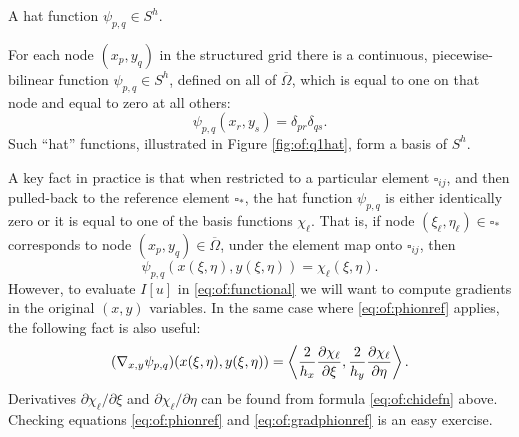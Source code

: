 \begin{marginfigure}

\caption{A hat function $\psi_{p,q} \in S^h$.}
\label{fig:of:q1hat}
\end{marginfigure}

For each node $(x_p,y_q)$ in the structured grid there is a continuous, piecewise-bilinear function $\psi_{p,q} \in S^h$, defined on all of $\overline\Omega$, which is equal to one on that node and equal to zero at all others:
\begin{equation}
  \psi_{p,q}(x_r,y_s) = \delta_{pr} \delta_{qs}.  \label{eq:of:psinodewise}
\end{equation}
Such ``hat'' functions, illustrated in Figure \ref{fig:of:q1hat}, form a basis of $S^h$.

A key fact in practice is that when restricted to a particular element $\square_{ij}$, and then pulled-back to the reference element $\square_\ast$, the hat function $\psi_{p,q}$ is either identically zero or it is equal to one of the basis functions $\chi_\ell$.  That is, if node $(\xi_\ell,\eta_\ell) \in \square_\ast$ corresponds to node $(x_p,y_q) \in \overline\Omega$, under the element map onto $\square_{ij}$, then 
\begin{equation}
  \psi_{p,q}(x(\xi,\eta),y(\xi,\eta)) = \chi_\ell(\xi,\eta).  \label{eq:of:phionref}
\end{equation}
However, to evaluate $I[u]$ in \eqref{eq:of:functional} we will want to compute gradients in the original $(x,y)$ variables.  In the same case where \eqref{eq:of:phionref} applies, the following fact is also useful:
\begin{equation}
  (\nabla_{x,y} \psi_{p,q})(x(\xi,\eta),y(\xi,\eta)) = \left<\frac{2}{h_x}\frac{\partial\chi_\ell}{\partial \xi},\frac{2}{h_y}\frac{\partial\chi_\ell}{\partial \eta}\right>.   \label{eq:of:gradphionref}
\end{equation}
Derivatives $\partial\chi_\ell/\partial \xi$ and $\partial\chi_\ell/\partial \eta$ can be found from formula \eqref{eq:of:chidefn} above.  Checking equations \eqref{eq:of:phionref} and \eqref{eq:of:gradphionref} is an easy exercise.

